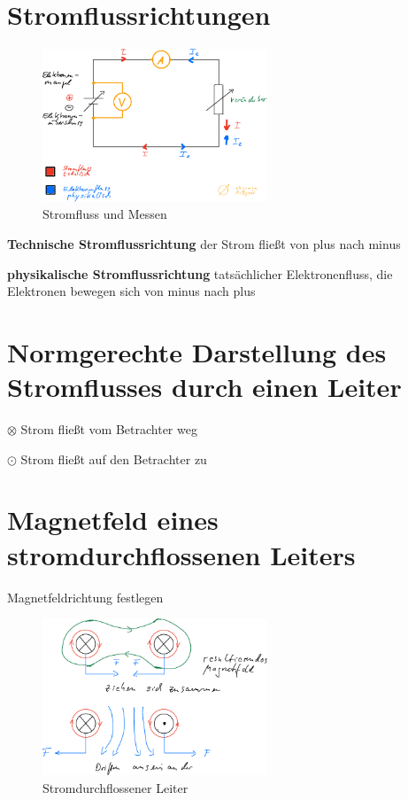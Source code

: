 \newpage

\section{Stromflussrichtungen}\label{stromflussrichtungen}

\begin{figure}[!ht]%
\centering
\includegraphics[width=0.6\textwidth]{images/Skizze/06_Stromfluss_Messen_Skizze.pdf}
\caption{Stromfluss und Messen}
\end{figure}

\textbf{Technische Stromflussrichtung} der Strom fließt von plus nach
minus

\textbf{physikalische Stromflussrichtung} tatsächlicher Elektronenfluss,
die Elektronen bewegen sich von minus nach plus

\newpage

\section{Normgerechte Darstellung des Stromflusses durch einen
Leiter}\label{normgerechte-darstellung-des-stromflusses-durch-einen-leiter}

$\otimes$ Strom fließt vom Betrachter weg

$\odot$ Strom fließt auf den Betrachter zu

\section{Magnetfeld eines stromdurchflossenen
Leiters}\label{magnetfeld-eines-stromdurchflossenen-leiters}

Magnetfeldrichtung festlegen

\begin{figure}[!ht]%
\centering
\includegraphics[width=0.6\textwidth]{images/Skizze/05_StromdurchflossenerLeiter_Skizze.pdf}
\caption{Stromdurchflossener Leiter}
\end{figure}


